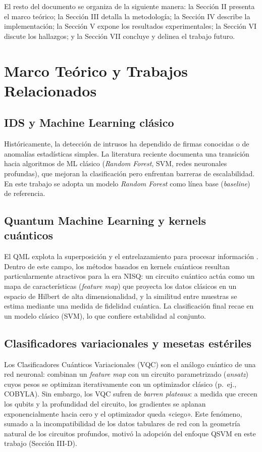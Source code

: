 \documentclass[10pt,conference]{IEEEtran}
\begin{document}
El resto del documento se organiza de la siguiente manera: la Sección
II presenta el marco teórico; la Sección III detalla la metodología; la
Sección IV describe la implementación; la Sección V expone los
resultados experimentales; la Sección VI discute los hallazgos; y la
Sección VII concluye y delinea el trabajo futuro.

\section{Marco Teórico y Trabajos Relacionados}

\subsection{IDS y Machine Learning clásico}
Históricamente, la detección de intrusos ha dependido de firmas
conocidas o de anomalías estadísticas simples. La literatura reciente
documenta una transición hacia algoritmos de ML clásico
(\textit{Random Forest}, SVM, redes neuronales profundas), que mejoran
la clasificación pero enfrentan barreras de escalabilidad. En este
trabajo se adopta un modelo \textit{Random Forest} como línea base
(\textit{baseline}) de referencia.

\subsection{Quantum Machine Learning y kernels cuánticos}
El QML explota la superposición y el entrelazamiento para procesar
información \cite{biamonte2017}. Dentro de este campo, los métodos
basados en kernels cuánticos resultan particularmente atractivos para la
era NISQ: un circuito cuántico actúa como un mapa de características
(\textit{feature map}) que proyecta los datos clásicos en un espacio de
Hilbert de alta dimensionalidad, y la similitud entre muestras se estima
mediante una medida de fidelidad cuántica. La clasificación final recae
en un modelo clásico (SVM), lo que confiere estabilidad al conjunto.

\subsection{Clasificadores variacionales y mesetas estériles}
Los Clasificadores Cuánticos Variacionales (VQC) son el análogo
cuántico de una red neuronal: combinan un \textit{feature map} con un
circuito parametrizado (\textit{ansatz}) cuyos pesos se optimizan
iterativamente con un optimizador clásico (p.~ej., COBYLA). Sin
embargo, los VQC sufren de \textit{barren plateaus}: a medida que
crecen los qubits y la profundidad del circuito, los gradientes se
aplanan exponencialmente hacia cero y el optimizador queda «ciego».
Este fenómeno, sumado a la incompatibilidad de los datos tabulares de
red con la geometría natural de los circuitos profundos, motivó la
adopción del enfoque QSVM en este trabajo (Sección III-D).
\end{document}
